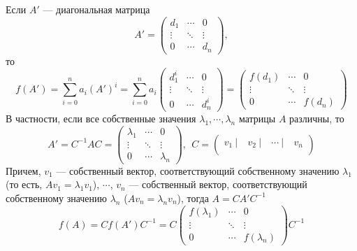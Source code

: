 Если $A'$ --- диагональная матрица\[A'=\begin{pmatrix}
d_1 & \cdots & 0\\
\vdots & \ddots & \vdots\\
0 & \cdots & d_n
\end{pmatrix},\]
то \[f(A')=\sum\limits_{i=0}^n a_i(A')^i=\sum\limits_{i=0}^n a_i\begin{pmatrix}
d_1^i & \cdots & 0\\
\vdots & \ddots & \vdots\\
0 & \cdots & d_n^i
\end{pmatrix}=\begin{pmatrix}
f(d_1) & \cdots & 0\\
\vdots & \ddots & \vdots\\
0 & \cdots & f(d_n)
\end{pmatrix}\]
В частности, если все собственные значения $\lambda_1,\cdots, \lambda_n$ матрицы $A$ различны, то 
\[A'=C^{-1}AC=\begin{pmatrix}
\lambda_1 & \cdots & 0\\
\vdots & \ddots & \vdots\\
0 & \cdots & \lambda_n
\end{pmatrix},~~C= \begin{pmatrix}
v_1~| & ~v_2~| & ~\cdots~| & ~v_n\\
\end{pmatrix}\]
Причем, $v_1$ --- собственный вектор, соответствующий собственному значению $\lambda_1$ (то есть, $Av_1=\lambda_1 v_1$), $\cdots$, $v_n$ --- собственный вектор, соответствующий собственному значению $\lambda_n$ ($Av_n=\lambda_n v_n$), тогда $A=CA'C^{-1}$
\[f(A)=Cf(A')C^{-1}=C\begin{pmatrix}
f(\lambda_1) & \cdots & 0\\
\vdots & \ddots & \vdots\\
0 & \cdots & f(\lambda_n)
\end{pmatrix}C^{-1}\]
